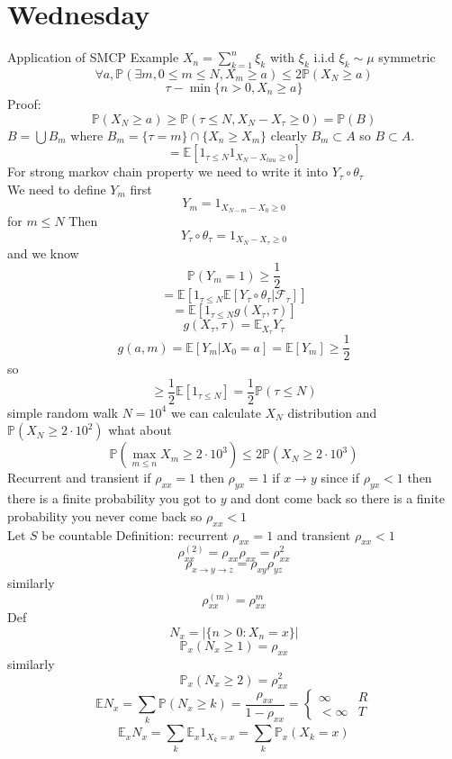 \documentclass[11pt]{article}
\begin{document}
\section{Wednesday}
Application of SMCP
Example $X_n = \sum_{k=1}^{n}\xi_k$ with $\xi_k$ i.i.d  $\xi_k \sim \mu$ symmetric
\[
\forall a, \mathbb{P}(\exists m, 0 \le m \le N, X_m \ge a) \le 2 \mathbb{P}(X_N \ge a)
\] 
\[
    \tau - \min\{n > 0, X_n \ge a\}
\] 
Proof:
\[
    \mathbb{P}(X_N \ge a) \ge \mathbb{P}(\tau \le N,  X_N - X_{\tau} \ge 0) = \mathbb{P}(B)
\] 
$B = \bigcup B_m$ where $B_m = \{\tau = m\} \cap \{X_n \ge X_m\}$ clearly $B_m \subset A$ so $B \subset A$.
\[
    = \mathbb{E}[1_{\tau \le N} 1_{X_N - X_{tau} \ge 0}]
\] 
For strong markov chain property we need to write it into $Y_\tau \circ \theta_\tau$\\
We need to define $Y_m$ first
 \[
     Y_m = 1_{X_{N-m} - X_0 \ge 0}
\] 
for $m \le N$
Then
\[
    Y_\tau \circ \theta_\tau = 1_{X_N - X_{\tau} \ge 0}
\] 
and we know
\[
\mathbb{P}(Y_m = 1) \ge \frac{1}{2} 
\] 
\[
    = \mathbb{E}[1_{\tau \le N} \mathbb{E}[ Y_{\tau} \circ \theta_\tau | \mathcal{F}_\tau]]
\] 
\[
    = \mathbb{E}[1_{\tau \le N} g(X_{\tau},\tau)]
\] 
\[
    g(X_\tau,\tau) = \mathbb{E}_{X_\tau}Y_\tau
\] 
\[
    g(a,m) = \mathbb{E}[Y_m | X_0 = a] = \mathbb{E}[Y_m] \ge \frac{1}{2}
\] 
so
\[
    \ge \frac{1}{2} \mathbb{E}[1_{\tau \le N}] = \frac{1}{2} \mathbb{P}(\tau \le N)
\] 
simple random walk $N = 10^{4}$ we can calculate $X_N$ distribution and
$ \mathbb{P}(X_N \ge 2\cdot10^{2})$ 
what about
\[
    \mathbb{P}(\max_{m \le n} X_m \ge 2 \cdot 10^{3}) \le 2 \mathbb{P}(X_N \ge 2 \cdot 10^{3})
\] 
Recurrent and transient
if $\rho_{xx} = 1$ then $\rho_{yx} = 1$ if $x \to y$ since if  $\rho_{yx} < 1$ then there
is a finite probability you got to $y$ and dont come back so there is a finite probability you never come back so  $\rho_{xx} < 1$\\
Let $S$ be countable
Definition: recurrent $\rho_{xx} = 1$ and transient $\rho_{xx} < 1$
\[
    \rho_{xx}^{(2)} = \rho_{xx} \rho_{xx} = \rho_{xx}^2
\] 
\[
    \rho_{x\to y\to z} = \rho_{xy}\rho_{yz}
\] 
similarly
\[
    \rho_{xx}^{(m)} = \rho_{xx}^{m}
\] 
Def
\[
    N_x = |\{n > 0 : X_n = x\}|
\] 
\[
    \mathbb{P}_x(N_x \ge 1) = \rho_{xx}
\] 
similarly
\[
    \mathbb{P}_x(N_x \ge 2) = \rho_{xx}^2
\] 
\[
    \mathbb{E} N_x = \sum_{k}^{} \mathbb{P}(N_x \ge k) = \frac{\rho_{xx}}{1- \rho_{xx}} = 
    \begin{cases}
        \infty & R\\
        < \infty & T
    \end{cases}
\] 
\[
    \mathbb{E}_x N_x = \sum_{k}^{} \mathbb{E}_x 1_{X_k = x} = \sum_{k}^{} \mathbb{P}_x(X_k = x)
\] 
\end{document}
